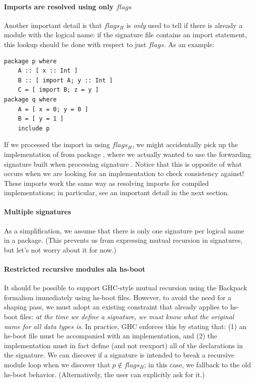 \documentclass{article}
\begin{document}
\paragraph{Imports are resolved using only $flags$}
Another important detail is that $flags_H$ is \emph{only} used to tell
if there is already a module with the logical name: if the signature
file contains an import statement, this lookup should be done with
respect to just $flags$.  As an example:

\begin{verbatim}
package p where
    A :: [ x :: Int ]
    B :: [ import A; y :: Int ]
    C = [ import B; z = y ]
package q where
    A = [ x = 0; y = 0 ]
    B = [ y = 1 ]
    include p
\end{verbatim}

If we processed the import in  using $flags_H$, we might
accidentally pick up the implementation of  from package ,
where we actually wanted to use the forwarding signature built when
processing signature .  Notice that this is opposite of what occurs
when we are looking for an implementation to check consistency against!
These imports work the same way as resolving imports for compiled implementations;
in particular, see an important detail in the next section.

\paragraph{Multiple signatures}  As a simplification, we assume that there
is only one signature per logical name in a package.  (This prevents
us from expressing mutual recursion in signatures, but let's not worry
about it for now.)

\paragraph{Restricted recursive modules ala hs-boot}\label{sec:hs-boot-restrict}
It should be possible to support GHC-style mutual recursion using the
Backpack formalism immediately using hs-boot files.  However, to avoid
the need for a shaping pass, we must adopt an existing constraint that
already applies to hs-boot files: \emph{at the time we define a signature,
we must know what the original name for all data types is}.  In practice,
GHC enforces this by stating that: (1) an hs-boot file must be
accompanied with an implementation, and (2) the implementation must
in fact define (and not reexport) all of the declarations in the signature.
We can discover if a signature is intended to break a recursive module loop
when we discover that $p\notin flags_H$; in this case, we fallback to the
old hs-boot behavior. (Alternatively, the user can explicitly ask for it.)
\end{document}
